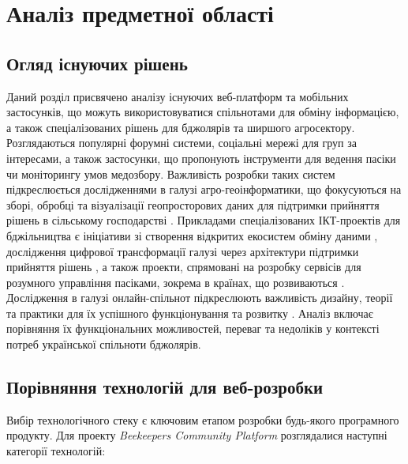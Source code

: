 \chapter{Аналіз предметної області}
\label{ch:analysis}

\section{Огляд існуючих рішень}
\label{sec:existing_solutions}
Даний розділ присвячено аналізу існуючих веб-платформ та мобільних застосунків, що можуть використовуватися спільнотами для обміну інформацією, а також спеціалізованих рішень для бджолярів та ширшого агросектору. Розглядаються популярні форумні системи, соціальні мережі для груп за інтересами, а також застосунки, що пропонують інструменти для ведення пасіки чи моніторингу умов медозбору. Важливість розробки таких систем підкреслюється дослідженнями в галузі агро-геоінформатики, що фокусуються на зборі, обробці та візуалізації геопросторових даних для підтримки прийняття рішень в сільському господарстві \cite{granell2015agrogeoinformatics}. Прикладами спеціалізованих ІКТ-проектів для бджільництва є ініціативи зі створення відкритих екосистем обміну даними \cite{guruprasad2024beeopen}, дослідження цифрової трансформації галузі через архітектури підтримки прийняття рішень \cite{huet2022digitalbeekeeping}, а також проекти, спрямовані на розробку сервісів для розумного управління пасіками, зокрема в країнах, що розвиваються \cite{wakjira2021sams}. Дослідження в галузі онлайн-спільнот підкреслюють важливість дизайну, теорії та практики для їх успішного функціонування та розвитку \cite{preece2005onlinecommunities}. Аналіз включає порівняння їх функціональних можливостей, переваг та недоліків у контексті потреб української спільноти бджолярів.

\section{Порівняння технологій для веб-розробки}
\label{sec:tech_comparison}
Вибір технологічного стеку є ключовим етапом розробки будь-якого програмного продукту. Для проекту \textit{Beekeepers Community Platform} розглядалися наступні категорії технологій:

